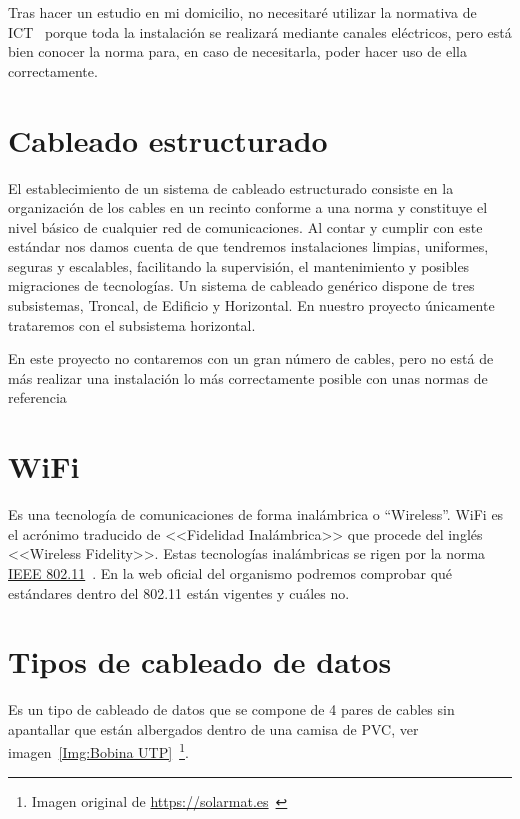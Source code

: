 Tras hacer un estudio en mi domicilio, no necesitaré utilizar la normativa de ICT~\cite{manual:ICT} porque toda la instalación se realizará mediante canales eléctricos, pero está bien conocer la norma para, en caso de necesitarla, poder hacer uso de ella correctamente.

\section{Cableado estructurado}\label{concepto:Cableado_estructurado}
El establecimiento de un sistema de cableado estructurado consiste en la organización de los cables en un recinto conforme a una norma y constituye el nivel básico de cualquier red de comunicaciones.
Al contar y cumplir con este estándar nos damos cuenta de que tendremos instalaciones limpias, uniformes, seguras y escalables, facilitando la supervisión, el mantenimiento y posibles migraciones de tecnologías.
Un sistema de cableado genérico dispone de tres subsistemas, Troncal, de Edificio y Horizontal. En nuestro proyecto únicamente trataremos con el subsistema horizontal.

En este proyecto no contaremos con un gran número de cables, pero no está de más realizar una instalación lo más correctamente posible con unas normas de referencia

\section{WiFi}\label{concepto:WIFI}
Es una tecnología de comunicaciones de forma inalámbrica o “Wireless”. WiFi es el acrónimo traducido de <<Fidelidad Inalámbrica>> que procede del inglés <<Wireless Fidelity>>.
Estas tecnologías inalámbricas se rigen por la norma \underline{IEEE 802.11}~\cite{manual:IEEE802.11}.
En la web oficial del organismo podremos comprobar qué estándares dentro del 802.11 están vigentes y cuáles no.

\section{Tipos de cableado de datos}\label{concepto:UTP}
Es un tipo de cableado de datos que se compone de 4 pares de cables sin apantallar que están albergados dentro de una camisa de PVC, ver imagen~\ref{Img:Bobina UTP}~\footnote{Imagen original de \url{https://solarmat.es}~\cite{wiki:Creative}}.

